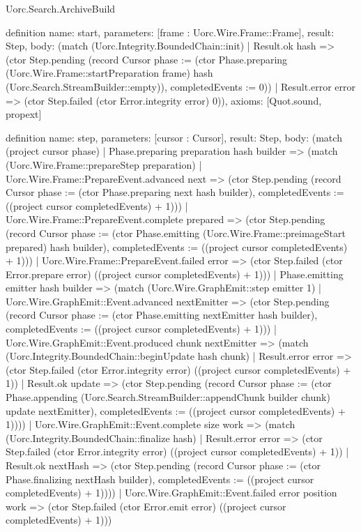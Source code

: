 \begin{lexlean}{Uorc.Search.ArchiveBuild}
\begin{semanticmodule}
definition{
  name: start,
  parameters: [frame : Uorc.Wire.Frame::Frame],
  result: Step,
  body: (match (Uorc.Integrity.BoundedChain::init)
    | Result.ok hash => (ctor Step.pending (record Cursor {phase := (ctor Phase.preparing (Uorc.Wire.Frame::startPreparation frame) hash (Uorc.Search.StreamBuilder::empty)), completedEvents := 0}))
    | Result.error error => (ctor Step.failed (ctor Error.integrity error) 0)),
  axioms: [Quot.sound, propext]
}

definition{
  name: step,
  parameters: [cursor : Cursor],
  result: Step,
  body: (match (project cursor phase)
    | Phase.preparing preparation hash builder => (match (Uorc.Wire.Frame::prepareStep preparation)
      | Uorc.Wire.Frame::PrepareEvent.advanced next => (ctor Step.pending (record Cursor {phase := (ctor Phase.preparing next hash builder), completedEvents := ((project cursor completedEvents) + 1)}))
      | Uorc.Wire.Frame::PrepareEvent.complete prepared => (ctor Step.pending (record Cursor {phase := (ctor Phase.emitting (Uorc.Wire.Frame::preimageStart prepared) hash builder), completedEvents := ((project cursor completedEvents) + 1)}))
      | Uorc.Wire.Frame::PrepareEvent.failed error => (ctor Step.failed (ctor Error.prepare error) ((project cursor completedEvents) + 1)))
    | Phase.emitting emitter hash builder => (match (Uorc.Wire.GraphEmit::step emitter 1)
      | Uorc.Wire.GraphEmit::Event.advanced nextEmitter => (ctor Step.pending (record Cursor {phase := (ctor Phase.emitting nextEmitter hash builder), completedEvents := ((project cursor completedEvents) + 1)}))
      | Uorc.Wire.GraphEmit::Event.produced chunk nextEmitter => (match (Uorc.Integrity.BoundedChain::beginUpdate hash chunk)
        | Result.error error => (ctor Step.failed (ctor Error.integrity error) ((project cursor completedEvents) + 1))
        | Result.ok update => (ctor Step.pending (record Cursor {phase := (ctor Phase.appending (Uorc.Search.StreamBuilder::appendChunk builder chunk) update nextEmitter), completedEvents := ((project cursor completedEvents) + 1)})))
      | Uorc.Wire.GraphEmit::Event.complete size work => (match (Uorc.Integrity.BoundedChain::finalize hash)
        | Result.error error => (ctor Step.failed (ctor Error.integrity error) ((project cursor completedEvents) + 1))
        | Result.ok nextHash => (ctor Step.pending (record Cursor {phase := (ctor Phase.finalizing nextHash builder), completedEvents := ((project cursor completedEvents) + 1)})))
      | Uorc.Wire.GraphEmit::Event.failed error position work => (ctor Step.failed (ctor Error.emit error) ((project cursor completedEvents) + 1)))
}
\end{semanticmodule}
\end{lexlean}
